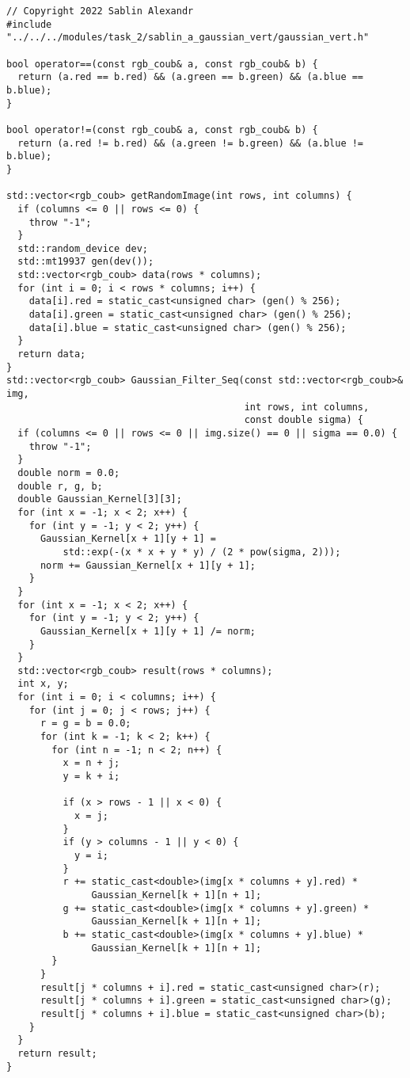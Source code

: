 \documentclass{report}
\begin{document}
\begin{lstlisting}
// Copyright 2022 Sablin Alexandr
#include "../../../modules/task_2/sablin_a_gaussian_vert/gaussian_vert.h"

bool operator==(const rgb_coub& a, const rgb_coub& b) {
  return (a.red == b.red) && (a.green == b.green) && (a.blue == b.blue);
}

bool operator!=(const rgb_coub& a, const rgb_coub& b) {
  return (a.red != b.red) && (a.green != b.green) && (a.blue != b.blue);
}

std::vector<rgb_coub> getRandomImage(int rows, int columns) {
  if (columns <= 0 || rows <= 0) {
    throw "-1";
  }
  std::random_device dev;
  std::mt19937 gen(dev());
  std::vector<rgb_coub> data(rows * columns);
  for (int i = 0; i < rows * columns; i++) {
    data[i].red = static_cast<unsigned char> (gen() % 256);
    data[i].green = static_cast<unsigned char> (gen() % 256);
    data[i].blue = static_cast<unsigned char> (gen() % 256);
  }
  return data;
}
std::vector<rgb_coub> Gaussian_Filter_Seq(const std::vector<rgb_coub>& img,
                                          int rows, int columns,
                                          const double sigma) {
  if (columns <= 0 || rows <= 0 || img.size() == 0 || sigma == 0.0) {
    throw "-1";
  }
  double norm = 0.0;
  double r, g, b;
  double Gaussian_Kernel[3][3];
  for (int x = -1; x < 2; x++) {
    for (int y = -1; y < 2; y++) {
      Gaussian_Kernel[x + 1][y + 1] =
          std::exp(-(x * x + y * y) / (2 * pow(sigma, 2)));
      norm += Gaussian_Kernel[x + 1][y + 1];
    }
  }
  for (int x = -1; x < 2; x++) {
    for (int y = -1; y < 2; y++) {
      Gaussian_Kernel[x + 1][y + 1] /= norm;
    }
  }
  std::vector<rgb_coub> result(rows * columns);
  int x, y;
  for (int i = 0; i < columns; i++) {
    for (int j = 0; j < rows; j++) {
      r = g = b = 0.0;
      for (int k = -1; k < 2; k++) {
        for (int n = -1; n < 2; n++) {
          x = n + j;
          y = k + i;

          if (x > rows - 1 || x < 0) {
            x = j;
          }
          if (y > columns - 1 || y < 0) {
            y = i;
          }
          r += static_cast<double>(img[x * columns + y].red) *
               Gaussian_Kernel[k + 1][n + 1];
          g += static_cast<double>(img[x * columns + y].green) *
               Gaussian_Kernel[k + 1][n + 1];
          b += static_cast<double>(img[x * columns + y].blue) *
               Gaussian_Kernel[k + 1][n + 1];
        }
      }
      result[j * columns + i].red = static_cast<unsigned char>(r);
      result[j * columns + i].green = static_cast<unsigned char>(g);
      result[j * columns + i].blue = static_cast<unsigned char>(b);
    }
  }
  return result;
}


\end{lstlisting}
\end{document}
